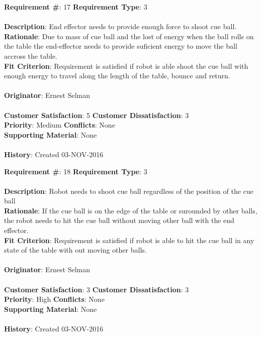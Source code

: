 \documentclass[titlepage]{article}
\begin{document}
\begin{framed}
	\noindent\textbf{Requirement \#}: 17 \hfill \textbf{Requirement Type}: 3 \hfill\\\\
	\noindent\textbf{Description}: End effector needs to provide enough force to shoot cue ball. \\
	\textbf{Rationale}: Due to mass of cue ball and the lost of energy when the ball rolls on the table the end-effector needs to provide suficient energy to move the ball accross the table.\\
	\textbf{Fit Criterion}: Requirement is satisfied if robot is able shoot the cue ball with enough energy to travel along the length of the table, bounce and return. \\\\
	\textbf{Originator}: Ernest Selman\\\\
	\noindent\textbf{Customer Satisfaction}: 5 \hfill 	\textbf{Customer Dissatisfaction}: 3 \hfill\\
	\textbf{Priority}: Medium \hfill \textbf{Conflicts}: None \hfill\\
	\textbf{Supporting Material}: None\\\\
	\noindent\textbf{History}: Created 03-NOV-2016
\end{framed}

\begin{framed}
	\noindent\textbf{Requirement \#}: 18 \hfill \textbf{Requirement Type}: 3 \hfill\\\\
	\noindent\textbf{Description}: Robot needs to shoot cue ball regardless of the position of the cue ball  \\
	\textbf{Rationale}: If the cue ball is on the edge of the table or surounded by other balls, the robot needs to hit the cue ball without moving other ball with the end effector. \\
	\textbf{Fit Criterion}: Requirement is satisfied if robot is able to hit the cue ball in any state of the table with out moving other balls. \\\\
	\textbf{Originator}: Ernest Selman\\\\
	\noindent\textbf{Customer Satisfaction}: 3 \hfill 	\textbf{Customer Dissatisfaction}: 3 \hfill\\
	\textbf{Priority}: High \hfill \textbf{Conflicts}: None \hfill\\
	\textbf{Supporting Material}: None\\\\
	\noindent\textbf{History}: Created 03-NOV-2016
\end{framed}
\end{document}
